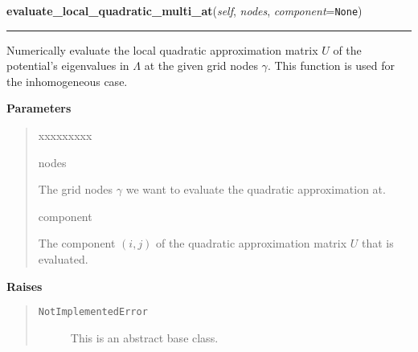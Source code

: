 \hspace{.8\funcindent}\begin{boxedminipage}{\funcwidth}

    \raggedright \textbf{evaluate\_local\_quadratic\_multi\_at}(\textit{self}, \textit{nodes}, \textit{component}={\tt None})

    \vspace{-1.5ex}

    \rule{\textwidth}{0.5\fboxrule}
\setlength{\parskip}{2ex}
    Numerically evaluate the local quadratic approximation matrix $U$ of
    the potential's eigenvalues in $\Lambda$ at the given
    grid nodes $\gamma$. This function is used for the
    inhomogeneous case.

\setlength{\parskip}{1ex}
      \textbf{Parameters}
      \vspace{-1ex}

      \begin{quote}
        \begin{Ventry}{xxxxxxxxx}

          \item[nodes]

          The grid nodes $\gamma$ we want to evaluate the
          quadratic approximation at.

          \item[component]

          The component $\left(i,j \right)$ of the quadratic
          approximation matrix $U$ that is evaluated.

        \end{Ventry}

      \end{quote}

      \textbf{Raises}
    \vspace{-1ex}

      \begin{quote}
        \begin{description}

          \item[\texttt{NotImplementedError}]

          This is an abstract base class.

        \end{description}

      \end{quote}

    \end{boxedminipage}

